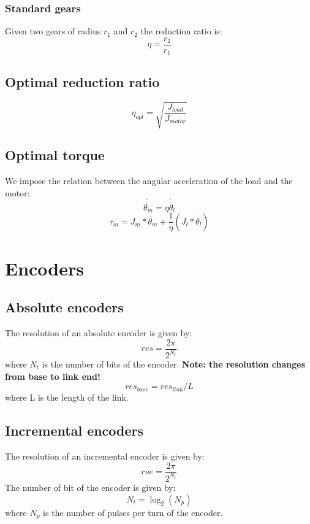 \documentclass[11pt]{article}
\begin{document}
\subsubsection{Standard gears}
Given two gears of radius $r_1$ and $r_2$ the reduction ratio is:
\begin{equation}
  \eta = \frac{r_2}{r_1}
\end{equation}
\subsection{Optimal reduction ratio}
\begin{equation}
  \eta_{opt} = \sqrt{\frac{J_{load}}{J_{motor}}}
\end{equation}
\subsection{Optimal torque}
We impose the relation between the angular acceleration
of the load and the motor:
\begin{equation}
  \dot{\dot{\theta_{m}}} = \eta\dot{\dot{\theta_{l}}}
\end{equation}
\begin{equation}
  \tau_{m} = J_{m}*\dot{\dot{\theta_m}} +\frac{1}{\eta}(J_{l}*\dot{\dot{\theta_l}})
\end{equation}
\section{Encoders}\label{sec:encoders}
\subsection{Absolute encoders}
The resolution of an absolute encoder is given by:
\begin{equation}
  res = \frac{2\pi}{2^{N_t}}
\end{equation}
where $N_t$ is the number of bits of the encoder.
\textbf{Note: the resolution changes from base to link end!}
\begin{equation}
  res_{base} = res_{link}/L
\end{equation}
where L is the length of the link.
\subsection{Incremental encoders}
The resolution of an incremental encoder is given by:
\begin{equation}
  rse = \frac{2\pi}{2^{N_t}}
\end{equation}
The number of bit of the encoder is given by:
\begin{equation}
  N_t = \log_2(N_p)
\end{equation}
where $N_p$ is the number of pulses per turn of the encoder.
\end{document}
